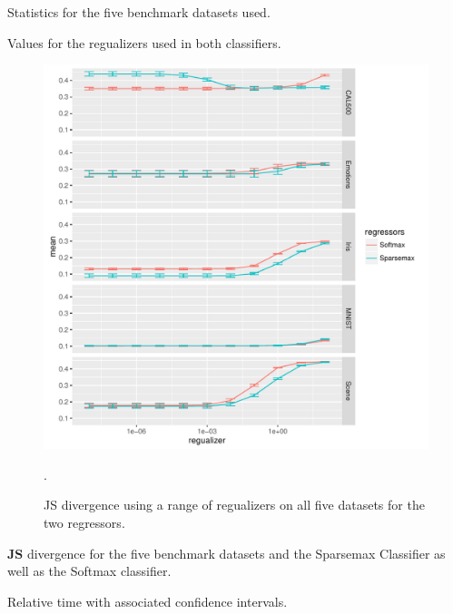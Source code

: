 \begin{table}[H]
\centering

\caption{Statistics for the five benchmark datasets used.}
\label{tab:datasets}
\end{table}


\begin{table}[H]
\centering

\caption{Values for the regualizers used in both classifiers.}
\label{tab:hyperparameters}
\end{table}

\begin{figure}[H]
	\centering
	\includegraphics[width=\columnwidth]{figures/hyperparameter.pdf}
\caption{JS divergence using a range of regualizers on all five datasets for the two regressors.}
\label{fig:hyperparameters}.
\end{figure}

\begin{table}[H]
\centering

\caption{$\mathbf{JS}$ divergence for the five benchmark datasets and the Sparsemax Classifier as well as the Softmax classifier.}
\end{table}


\begin{table}
\centering

\caption{Relative time with associated confidence intervals.}
\end{table}





